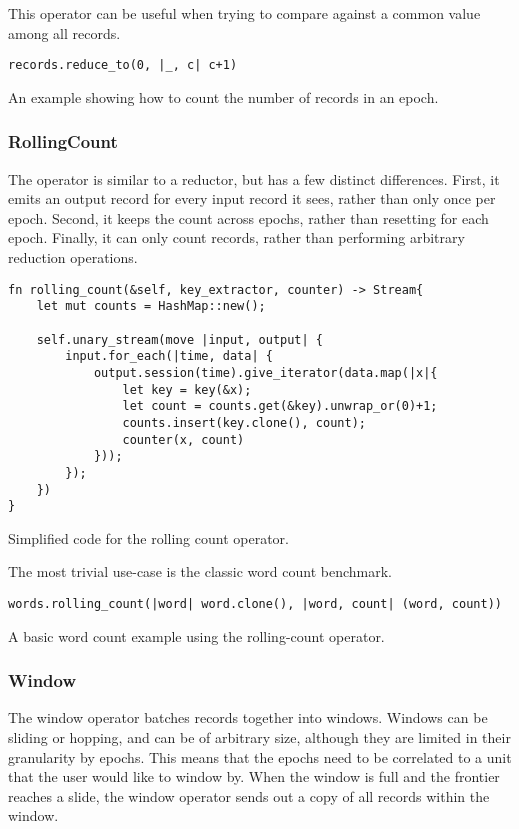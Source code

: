 This operator can be useful when trying to compare against a common value among all records.

\begin{listing}[H]
\begin{verbatim}
records.reduce_to(0, |_, c| c+1)
\end{verbatim}
\caption{An example showing how to count the number of records in an epoch.}
\label{lst:reduce-to-example}
\end{listing}

\subsubsection{RollingCount}
The  operator is similar to a reductor, but has a few distinct differences. First, it emits an output record for every input record it sees, rather than only once per epoch. Second, it keeps the count across epochs, rather than resetting for each epoch. Finally, it can only count records, rather than performing arbitrary reduction operations.

\begin{listing}[H]
\begin{verbatim}
fn rolling_count(&self, key_extractor, counter) -> Stream{
    let mut counts = HashMap::new();
    
    self.unary_stream(move |input, output| {
        input.for_each(|time, data| {
            output.session(time).give_iterator(data.map(|x|{
                let key = key(&x);
                let count = counts.get(&key).unwrap_or(0)+1;
                counts.insert(key.clone(), count);
                counter(x, count)
            }));
        });
    })
}
\end{verbatim}
  \caption{Simplified code for the rolling count operator.}
  \label{lst:rolling-count}
\end{listing}

The most trivial use-case is the classic word count benchmark.

\begin{listing}[H]
\begin{verbatim}
words.rolling_count(|word| word.clone(), |word, count| (word, count))
\end{verbatim}
\caption{A basic word count example using the rolling-count operator.}
\label{lst:rolling-count-example}
\end{listing}

\subsubsection{Window}
The window operator batches records together into windows. Windows can be sliding or hopping, and can be of arbitrary size, although they are limited in their granularity by epochs. This means that the epochs need to be correlated to a unit that the user would like to window by. When the window is full and the frontier reaches a slide, the window operator sends out a copy of all records within the window.

